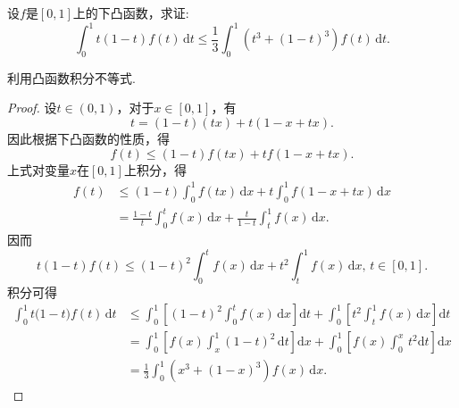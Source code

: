 \documentclass[../../main.tex]{subfiles}
\begin{document}
\begin{example}
设\( f \)是\([0,1]\)上的下凸函数，求证:
\[
\int_0^1 t(1-t)f(t)\,\text{d}t \leq \frac{1}{3}\int_0^1 \left(t^3 + (1-t)^3\right)f(t)\,\text{d}t.
\]
\end{example}
\begin{note}
利用凸函数积分不等式.
\end{note}
\begin{proof}
设\( t \in (0,1) \)，对于\( x \in [0,1] \)，有
\[
t = (1-t)(tx) + t(1 - x + tx).
\]
因此根据下凸函数的性质，得
\[
f(t) \leq (1-t)f(tx) + tf(1 - x + tx).
\]
上式对变量\( x \)在\([0,1]\)上积分，得
\begin{align*}
f(t) &\leq (1-t)\int_0^1 f(tx)\,\text{d}x + t\int_0^1 f(1 - x + tx)\,\text{d}x \\
&= \frac{1-t}{t} \int_0^t f(x)\,\text{d}x + \frac{t}{1-t}\int_t^1 f(x)\,\text{d}x.
\end{align*}
因而
\[
t(1-t)f(t) \leq (1-t)^2\int_0^t f(x)\,\text{d}x + t^2\int_t^1 f(x)\,\text{d}x, \, t \in [0,1].
\]
积分可得
\begin{align*}
\int_0^1{t(1}-t)f(t)\,\mathrm{d}t&\leqslant \int_0^1{\left[ (1-t)^2\int_0^t{f(x)\,\mathrm{d}x} \right] \mathrm{d}t}+\int_0^1{\left[ t^2\int_t^1{f(x)\,\mathrm{d}x} \right] \mathrm{d}t}
\\
&=\int_0^1{\left[ f\left( x \right) \int_x^1{(1-t)^2\,\mathrm{d}t} \right] \mathrm{d}x}+\int_0^1{\left[ f(x)\int_0^x{\,t^2\mathrm{d}t} \right] \mathrm{d}x}
\\
&=\frac{1}{3}\int_0^1{\left( x^3+(1-x)^3 \right) f(x)\,\mathrm{d}x}.
\end{align*}

\end{proof}
\end{document}
